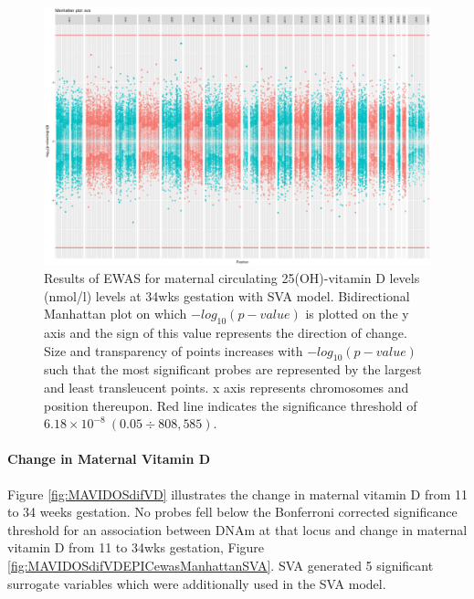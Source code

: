\documentclass[
]{book}
\begin{document}
\begin{figure}

{\centering \includegraphics[width=0.8\linewidth]{figs/MAVIDOSmVitD34EPICewasManhattanSVA} 

}

\caption{Results of EWAS for maternal circulating 25(OH)-vitamin D levels (nmol/l) levels at 34wks gestation with SVA model. Bidirectional Manhattan plot on which \(-log_{10}(p-value)\) is plotted on the y axis and the sign of this value represents the direction of change. Size and transparency of points increases with \(-log_{10}(p-value)\) such that the most significant probes are represented by the largest and least transleucent points. x axis represents chromosomes and position thereupon. Red line indicates the significance threshold of \(6.18\times10^{-8}~(0.05\div808,585)\).}\label{fig:MAVIDOSmVitD34EPICewasManhattanSVA}
\end{figure}



\hypertarget{change-in-maternal-vitamin-d}{%
\paragraph{Change in Maternal Vitamin D}\label{change-in-maternal-vitamin-d}}

Figure \ref{fig:MAVIDOSdifVD} illustrates the change in maternal vitamin D from 11 to 34 weeks gestation.
No probes fell below the Bonferroni corrected significance threshold for an association between DNAm at that locus and change in maternal vitamin D from 11 to 34wks gestation, Figure \ref{fig:MAVIDOSdifVDEPICewasManhattanSVA}.
SVA generated 5 significant surrogate variables which were additionally used in the SVA model.
\end{document}
